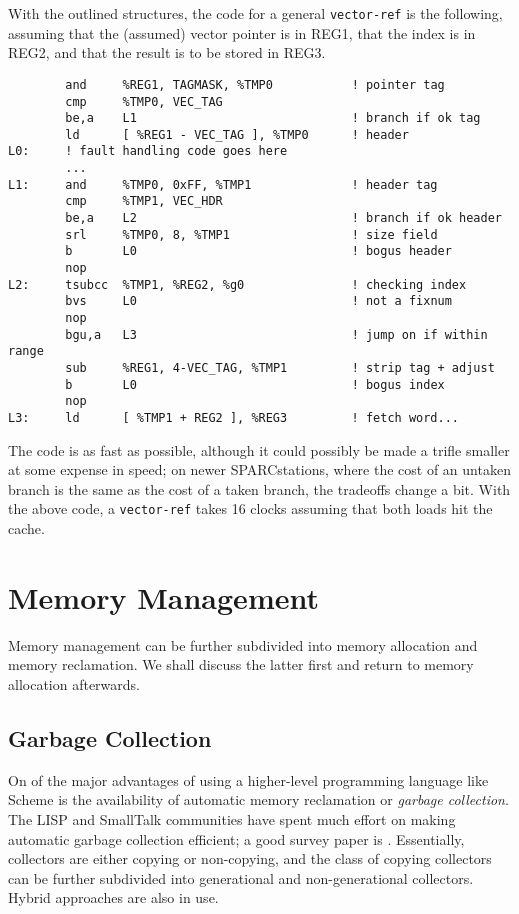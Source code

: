 With the outlined structures, the code for a general {\tt vector-ref} is 
the following, assuming that the (assumed) vector pointer is in REG1,
that the index is in REG2, and that the result is to be stored in REG3.

\begin{minipage}{\linewidth}
\begin{verbatim}
        and     %REG1, TAGMASK, %TMP0           ! pointer tag
        cmp     %TMP0, VEC_TAG
        be,a    L1                              ! branch if ok tag
        ld      [ %REG1 - VEC_TAG ], %TMP0      ! header
L0:     ! fault handling code goes here
        ...
L1:     and     %TMP0, 0xFF, %TMP1              ! header tag
        cmp     %TMP1, VEC_HDR
        be,a    L2                              ! branch if ok header
        srl     %TMP0, 8, %TMP1                 ! size field
        b       L0                              ! bogus header
        nop
L2:     tsubcc  %TMP1, %REG2, %g0               ! checking index
        bvs     L0                              ! not a fixnum
        nop
        bgu,a   L3                              ! jump on if within range
        sub     %REG1, 4-VEC_TAG, %TMP1         ! strip tag + adjust
        b       L0                              ! bogus index
        nop
L3:     ld      [ %TMP1 + REG2 ], %REG3         ! fetch word...
\end{verbatim}
\end{minipage}

The code is as fast as possible, although it could possibly be made a trifle
smaller at some expense in speed; on newer SPARCstations, where the cost of
an untaken branch is the same as the cost of a taken branch, the tradeoffs
change a bit. With the above code, a {\tt vector-ref} takes 16 clocks
assuming that both loads hit the cache.

\section{Memory Management}

Memory management can be further subdivided into memory allocation and memory
reclamation. We shall discuss the latter first and return to memory allocation
afterwards.

\subsection{Garbage Collection}

On of the major advantages of using a higher-level programming language like
Scheme is the availability of automatic memory reclamation or {\em garbage
collection}. The LISP and SmallTalk communities have spent much effort on
making automatic garbage collection efficient; a good survey paper is 
\cite{someoneelse}. Essentially, collectors are either copying
or non-copying, and the class of copying collectors can be further
subdivided into generational and non-generational collectors. Hybrid
approaches are also in use.

